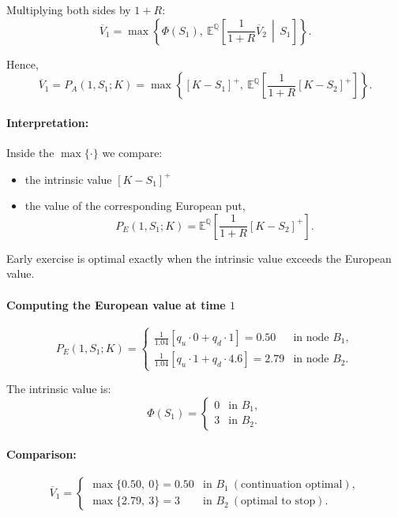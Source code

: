 \documentclass[12pt,a4paper]{article}
\theoremstyle{definition}
\begin{document}
Multiplying both sides by $1+R$:
\[
\overline{V}_1 = \max\left\{\Phi(S_1), \ \mathbb{E}^{\mathbb{Q}}\!\left[\frac{1}{1+R} \overline{V}_2 \,\middle|\, S_1\right]\right\}.
\]

Hence,
\[
\overline{V}_1 = P_A(1, S_1; K) = \max\left\{[K - S_1]^+, \ \mathbb{E}^{\mathbb{Q}}\!\left[\frac{1}{1+R} [K - S_2]^+\right]\right\}.
\]

\paragraph{Interpretation:}

Inside the $\max\{\cdot\}$ we compare:
\begin{itemize}
\item the intrinsic value $[K - S_1]^+$
\item the value of the corresponding European put,
\[
P_E(1, S_1; K) = \mathbb{E}^{\mathbb{Q}}\!\left[\frac{1}{1+R} [K - S_2]^+\right].
\]
\end{itemize}

Early exercise is optimal exactly when the intrinsic value exceeds the European value.

\paragraph{Computing the European value at time $1$}

\[
P_E(1, S_1; K) = 
\begin{cases}
\frac{1}{1.04} [q_u \cdot 0 + q_d \cdot 1] = 0.50 & \text{in node } B_1, \\
\frac{1}{1.04} [q_u \cdot 1 + q_d \cdot 4.6] = 2.79 & \text{in node } B_2.
\end{cases}
\]

The intrinsic value is:
\[
\Phi(S_1) = 
\begin{cases}
0 & \text{in } B_1, \\
3 & \text{in } B_2.
\end{cases}
\]

\paragraph{Comparison:}

\[
\overline{V}_1 = 
\begin{cases}
\max\{0.50, \ 0\} = 0.50 & \text{in } B_1 \ (\text{continuation optimal}), \\
\max\{2.79, \ 3\} = 3 & \text{in } B_2 \ (\text{optimal to stop}).
\end{cases}
\]
\end{document}
